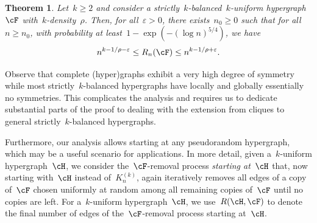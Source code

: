 \documentclass[11pt]{amsart}
\newcommand{\eps}{\varepsilon}
\newtheorem{theorem}[algocf]{Theorem}
\theoremstyle{definition}
\numberwithin{equation}{section}
\begin{document}
	\begin{theorem}\label{theorem: main}
		Let~$k\geq 2$ and consider a strictly~$k$-balanced~$k$-uniform hypergraph~$\cF$ with~$k$-density~$\rho$.
		Then, for all~$\eps>0$, there exists~$n_0\geq 0$ such that for all~$n\geq n_0$, with probability at least~$1-\exp(-(\log n)^{5/4})$, we have
		\begin{equation*}
			n^{k-1/\rho-\eps}\leq R_n(\cF)\leq n^{k-1/\rho+\eps}.
		\end{equation*}
	\end{theorem}
	
	Observe that complete (hyper)graphs exhibit a very high degree of symmetry while most strictly~$k$-balanced hypergraphs have locally and globally essentially no symmetries.
	This complicates the analysis and requires us to dedicate substantial parts of the proof to dealing with the extension from cliques to general strictly~$k$-balanced hypergraphs.
	
	Furthermore, our analysis allows starting at any pseudorandom hypergraph,
	which may be a useful scenario for applications.
	In more detail, 
	given a~$k$-uniform hypergraph~$\cH$, we consider the~$\cF$-removal process \emph{starting at~$\cH$} that, now starting with~$\cH$ instead of~$K^{(k)}_n$, again iteratively removes all edges of a copy of~$\cF$ chosen uniformly at random among all remaining copies of~$\cF$ until no copies are left.
	For a~$k$-uniform hypergraph~$\cH$, we use~$R(\cH,\cF)$ to denote the final number of edges of the~$\cF$-removal process starting at~$\cH$.
	
\end{document}
